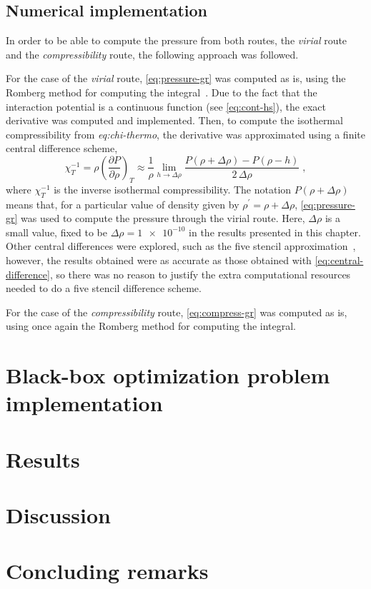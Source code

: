 \subsection{Numerical implementation}
In order to be able to compute the pressure from both routes, the \emph{virial} route and the \emph{compressibility} route, the following approach was followed.

For the case of the \emph{virial} route, \autoref{eq:pressure-gr} was computed as is, using 
the Romberg method for computing the integral~\cite{hammingNumericalMethodsScientists2012}. 
Due to the fact that the interaction potential is a continuous function (see 
\autoref{eq:cont-hs}), the exact derivative was computed and implemented. Then, to compute 
the isothermal compressibility from \emph{eq:chi-thermo}, the derivative was approximated 
using a finite central difference scheme,
\begin{equation}
    \chi_{T}^{-1} = \rho { \left( \frac{\partial P}{\partial \rho} \right) }_{T}
    \approx \frac{1}{\rho} \lim_{h \to \Delta \rho} \frac{P(\rho + \Delta \rho) - P(\rho - h)}{2 \, \Delta \rho}
    \; ,
    \label{eq:central-difference}
\end{equation}
where \(\chi_{T}^{-1}\) is the inverse isothermal compressibility. The notation 
\(P(\rho + \Delta \rho)\) means that, for a particular value of density given by 
\(\rho^{\prime}=\rho + \Delta \rho\), \autoref{eq:pressure-gr} was used to compute the 
pressure through the virial route. Here, \(\Delta \rho\) is a small value, fixed to be
\(\Delta \rho=\num{1e-10}\) in the results presented in this chapter. Other central 
differences were explored, such as the five stencil 
approximation~\cite{hammingNumericalMethodsScientists2012}, however, the results obtained 
were as accurate as those obtained with \autoref{eq:central-difference}, so there was no 
reason to justify the extra computational resources needed to do a five stencil difference 
scheme.

For the case of the \emph{compressibility} route, \autoref{eq:compress-gr} was computed as 
is, using once again the Romberg method for computing the integral.

\section{Black-box optimization problem implementation}
\section{Results}
\section{Discussion}
\section{Concluding remarks}